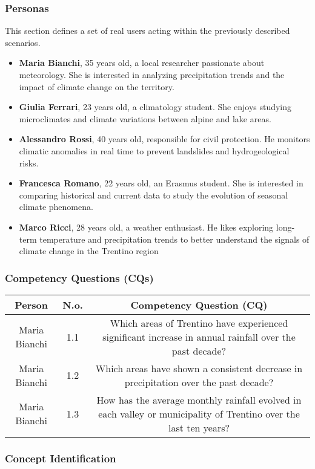 \subsubsection{Personas}
This section defines a set of real users acting within the previously described scenarios.
\begin{itemize}
    \item \textbf{Maria Bianchi}, 35 years old, a local researcher passionate about meteorology. She is interested in analyzing precipitation trends and the impact of climate change on the territory.
    \item \textbf{Giulia Ferrari}, 23 years old, a climatology student. She enjoys studying microclimates and climate variations between alpine and lake areas.
    \item \textbf{Alessandro Rossi}, 40 years old, responsible for civil protection. He monitors climatic anomalies in real time to prevent landslides and hydrogeological risks.
    \item \textbf{Francesca Romano}, 22 years old, an Erasmus student. She is interested in comparing historical and current data to study the evolution of seasonal climate phenomena.
    \item \textbf{Marco Ricci}, 28 years old, a weather enthusiast. He likes exploring long-term temperature and precipitation trends to better understand the signals of climate change in the Trentino region
\end{itemize}



\subsubsection{Competency Questions (CQs)}
\begin{tabular}{|c|c|c|}
\hline
\textbf{Person} & \textbf{N.o.} & \textbf{Competency Question (CQ)} \\
\hline
Maria Bianchi & 1.1 & Which areas of Trentino have experienced significant increase in annual rainfall over the past decade? \\ Maria Bianchi & 1.2 & Which areas have shown a consistent decrease in precipitation over the past decade? \\ Maria Bianchi & 1.3 & How has the average monthly rainfall evolved in each valley or municipality of Trentino over the last ten years? \\ 
\end{tabular}
\subsubsection{Concept Identification}
